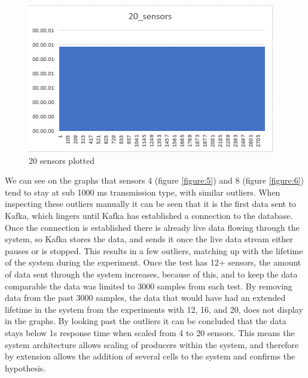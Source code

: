 \begin{figure}[!ht]
    \centering
    \includegraphics[scale=0.8]{Images/20sensors.png}
    \caption{20 sensors plotted}
    \label{figure:9}
\end{figure}

We can see on the graphs that sensors 4 (figure \ref{figure:5}) and 8 (figure \ref{figure:6}) tend to stay at sub 1000 ms transmission type, with similar outliers. When inspecting these outliers manually it can be seen that it is the first data sent to Kafka, which lingers until Kafka has established a connection to the database. Once the connection is established there is already live data flowing through the system, so Kafka stores the data, and sends it once the live data stream either pauses or is stopped. This results in a few outliers, matching up with the lifetime of the system during the experiment.
Once the test has 12+ sensors, the amount of data sent through the system increases, because of this, and to keep the data comparable the data was limited to 3000 samples from each test. By removing data from the past 3000 samples, the data that would have had an extended lifetime in the system from the experiments with 12, 16, and 20, does not display in the graphs.
By looking past the outliers it can be concluded that the data stays below 1s response time when scaled from 4 to 20 sensors. This means the system architecture allows scaling of producers within the system, and therefore by extension allows the addition of several cells to the system and confirms the hypothesis.